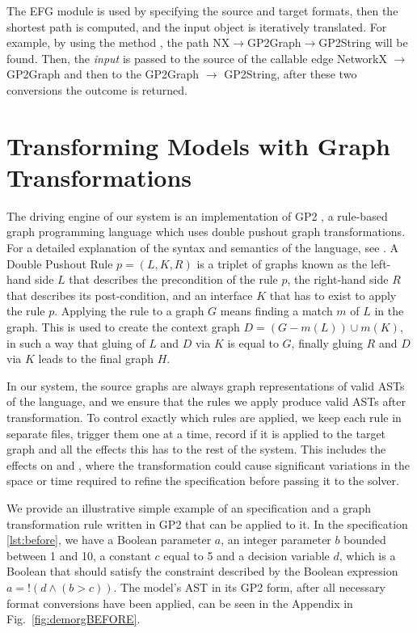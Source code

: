 The EFG module is used by specifying the source and target formats, then the shortest path is computed, and the input object is iteratively translated. For example, by using the method , the path NX$\rightarrow$GP2Graph$\rightarrow$GP2String will be found. Then, the \emph{input} is passed to the source of the callable edge NetworkX $\rightarrow$ GP2Graph and then to the GP2Graph $\rightarrow$ GP2String, after these two conversions the outcome is returned.


\section{Transforming Models with Graph Transformations}

The driving engine of our system is an implementation of GP2 \cite{10.1007/978-3-319-40530-8_7}, a rule-based graph programming language which uses double pushout graph transformations. For a detailed explanation of the syntax and semantics of the language, see \cite{plump2017imperative}.
A Double Pushout Rule $p = (L, K, R)$ is a triplet of graphs known as the left-hand side $L$ that describes the precondition of the rule $p$, the right-hand side $R$ that describes its post-condition, and an interface $K$ that has to exist to apply the rule $p$. Applying the rule to a graph $G$ means finding a match $m$ of $L$ in the graph. This is used to create the context graph $D=(G-m(L))\cup m(K)$, in such a way that gluing of $L$ and $D$ via $K$ is equal to $G$, finally gluing $R$ and $D$ via $K$ leads to the final graph $H$.

In our system, the source graphs are always graph representations of valid ASTs of the \essence language, and we ensure that the rules we apply produce valid \essence ASTs after transformation. To control exactly which rules are applied, we keep each rule in separate files, trigger them one at a time, record if it is applied to the target graph and all the effects this has to the rest of the system. This includes the effects on \conjure and \savilerow, where the transformation could cause significant variations in the space or time required to refine the specification before passing it to the solver.






We provide an illustrative simple example of an \essence specification and a graph transformation rule written in GP2 that can be applied to it. In the specification \ref{lst:before}, we have a Boolean parameter $a$, an integer parameter $b$ bounded between 1 and 10, a constant $c$ equal to 5 and a decision variable $d$, which is a Boolean that should satisfy the constraint described by the Boolean expression $a=!(d \land (b>c))$. The model's AST in its GP2 form, after all necessary format conversions have been applied, can be seen in the Appendix in Fig.~\ref{fig:demorgBEFORE}. 

